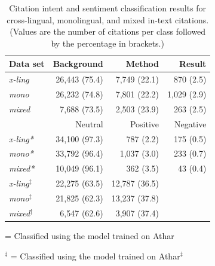 \begin{table}[tb]
\caption[Citation intent and sentiment classification results for cross-lingual, monolingual, and mixed in-text citations]{Citation intent and sentiment classification results for cross-lingual, monolingual, and mixed in-text citations. (Values are the number of citations per class followed by the percentage in brackets.)}
 \label{tab:citationclassificationdist}
  \centering
  \begin{small}
 \begin{threeparttable}
 \begin{tabular}{lrrr}
 \toprule
  Data set\hphantom{\ } & Background\hphantom{\ } & Method\hphantom{\ } & Result\hphantom{\ }\\
  \midrule
    \textit{x-ling} & 26,443 (75.4) & 7,749 (22.1) & 870 (2.5) \\
    \textit{mono} & 26,232 (74.8) & 7,801 (22.2) & 1,029 (2.9) \\
    \textit{mixed} & 7,688 (73.5) & 2,503 (23.9) & 263 (2.5) \\
  \midrule
  \midrule
  & Neutral\hphantom{\ } & Positive\hphantom{\ } & Negative\hphantom{\ }\\
  \midrule
    \textit{x-ling*} & 34,100 (97.3) & 787 (2.2) & 175 (0.5) \\
    \textit{mono*} & 33,792 (96.4) & 1,037 (3.0) & 233 (0.7) \\
    \textit{mixed*} & 10,049 (96.1) & 362 (3.5) & 43 (0.4) \\ \midrule
    \textit{x-ling$^{\ddagger}$} & 22,275 (63.5) & 12,787 (36.5) & \\
    \textit{mono$^{\ddagger}$} & 21,825 (62.3) & 13,237 (37.8) & \\
    \textit{mixed$^{\ddagger}$} & 6,547 (62.6) & 3,907 (37.4) & \\
  \bottomrule
 \end{tabular}
  \begin{tablenotes}
    \item * = Classified using the model trained on Athar
    \item $^{\ddagger}$ = Classified using the model trained on Athar$^{\ddagger}$
 \end{tablenotes}
\end{threeparttable}
  \end{small}
\end{table}

